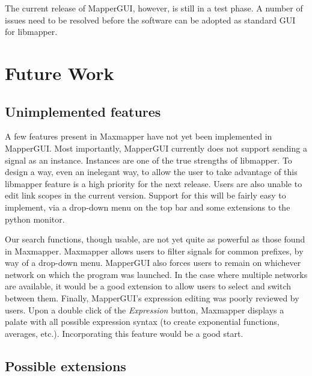 The current release of MapperGUI, however, is still in a test phase. A number of issues need to be resolved before the software can be adopted as standard GUI for libmapper. 

\section{Future Work}

	\subsection{Unimplemented features}

A few features present in Maxmapper have not yet been implemented in MapperGUI. Most importantly, MapperGUI currently does not support sending a signal as an instance. Instances are one of the true strengths of libmapper. To design a way, even an inelegant way, to allow the user to take advantage of this libmapper feature is a high priority for the next release. Users are also unable to edit link scopes in the current version. Support for this will be fairly easy to implement, via a drop-down menu on the top bar and some extensions to the python monitor. 

Our search functions, though usable, are not yet quite as powerful as those found in Maxmapper. Maxmapper allows users to filter signals for common prefixes, by way of a drop-down menu.  MapperGUI also forces users to remain on whichever network on which the program was launched. In the case where multiple networks are available, it would be a good extension to allow users to select and switch between them. Finally, MapperGUI's expression editing was poorly reviewed by users. Upon a double click of the \emph{Expression} button, Maxmapper displays a palate with all possible expression syntax (to create exponential functions, averages, etc.). Incorporating this feature would be a good start.


	\subsection{Possible extensions} %
	\label{sub:possible_extensions}

